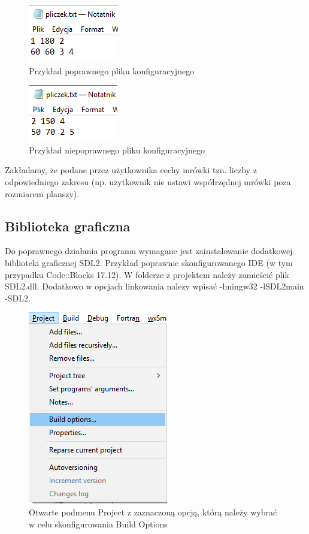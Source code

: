 \documentclass{article}
\begin{document}
\begin{figure}[ht]
\centering
\includegraphics[scale=0.8]{plikKonfiguracyjny1}
\caption{Przykład poprawnego pliku konfiguracyjnego}
\label{fig:plikKonfiguracyjny1}
\end{figure}

\begin{figure}[ht]
\centering
\includegraphics[scale=0.8]{plikKonfiguracyjny2}
\caption{Przykład niepoprawnego pliku konfiguracyjnego}
\label{fig:plikKonfiguracyjny2}
\end{figure}

Zakładamy, że podane przez użytkownika cechy mrówki tzn. liczby z odpowiedniego zakresu (np. użytkownik nie ustawi współrzędnej mrówki poza rozmiarem planszy). 
\newpage
\subsection{Biblioteka graficzna}
Do poprawnego działania programu wymagane jest zainstalowanie dodatkowej biblioteki graficznej SDL2. Przykład poprawnie skonfigurowanego IDE (w tym przypadku Code::Blocks 17.12).
\newline W folderze z projektem należy zamieścić plik SDL2.dll. Dodatkowo w opcjach linkowania nalezy wpisać -lmingw32 -lSDL2main -SDL2. 

\begin{figure}[h!]
\centering
\includegraphics[scale=0.5]{projectBuildOptions}
\caption{Otwarte podmenu Project z zaznaczoną opcją, którą należy wybrać w celu skonfigurowania Build Options}
\label{fig:projectBuildOptions}
\end{figure}
\end{document}
